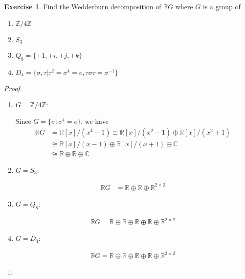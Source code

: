\documentclass[12pt]{extarticle}
\newcommand{\set}[1]{\{#1\}}
\newcommand{\R}{\mathbb{R}}
\newcommand{\C}{\mathbb{C}}
\newcommand{\Z}{\mathbb{Z}}
\newcommand{\<}{\langle}
\renewcommand{\>}{\rangle}
\theoremstyle{definition}
\newtheorem{exercise}{Exercise}
\begin{document}
\begin{exercise}
  Find the Wedderburn decomposition of $\R G$ where $G$ is a group of
  \begin{enumerate}
  \item
    $\Z / 4 \Z$
  \item
    $S_3$
  \item
    $Q_8 = \set{\pm 1, \pm i, \pm j, \pm k}$
  \item
    $D_4 = \set{ \sigma, \tau | \tau^2 = \sigma^4 = e, \tau \sigma \tau = \sigma^{-1}}$
  \end{enumerate}
\end{exercise}
\begin{proof}
  \begin{enumerate}
  \item
    $G=\Z / 4 \Z$:

    Since $G = \set{\sigma: \sigma^4=e}$, we have 
    \begin{align*}
      \R G &= \R[x]/(x^4-1) \cong \R[x]/(x^2-1) \oplus \R[x]/(x^2+1) \\
      &\cong \R[x]/(x-1) \oplus \R[x]/(x+1) \oplus \C \\
      &\cong \R \oplus \R \oplus \C
    \end{align*}
  \item
    $G = S_3$:
    
    \begin{align*}
      \R G &= \R \oplus \R \oplus \R^{2 \times 2}
    \end{align*}

  \item
    $G = Q_8$:

    \begin{align*}
      \R G = \R \oplus \R \oplus \R \oplus \R \oplus \R^{2\times2}
    \end{align*}

  \item
    $G = D_4$:
    
    \begin{align*}
      \R G = \R \oplus \R \oplus \R \oplus \R \oplus \R^{2\times2}
    \end{align*}
    
  \end{enumerate}
\end{proof}
\end{document}
